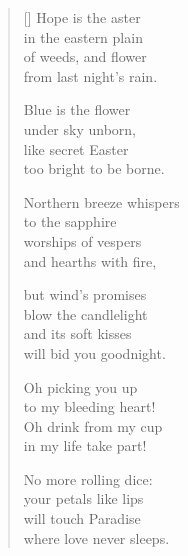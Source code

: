 \documentclass[12pt,a4paper]{article}
\begin{document}
\thispagestyle{empty}


\settowidth{\versewidth}{Northern breeze whispers}

\bigskip

\begin{verse}[\versewidth]
  Hope is the aster \\
  in the eastern plain \\
  of weeds, and flower \\
  from last night's rain.

  Blue is the flower \\
  under sky unborn, \\
  like secret Easter \\
  too bright to be borne.

  Northern breeze whispers \\
  to the sapphire \\
  worships of vespers \\
  and hearths with fire,

  but wind's promises \\
  blow the candlelight \\
  and its soft kisses \\
  will bid you goodnight.

  Oh picking you up \\
  to my bleeding heart! \\
  Oh drink from my cup \\
  in my life take part!

  No more rolling dice: \\
  your petals like lips \\
  will touch Paradise \\
  where love never sleeps.
\end{verse}
\end{document}
